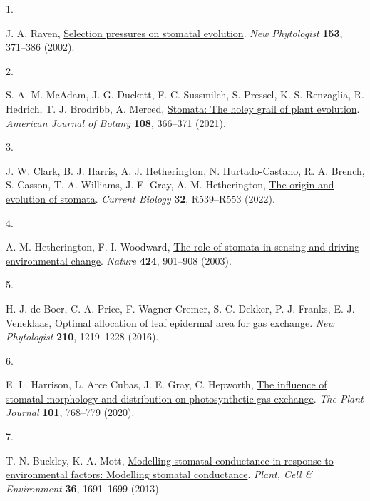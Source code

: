 \documentclass[
  letterpaper,
  DIV=11,
  numbers=noendperiod]{scrartcl}
\newlength{\cslhangindent}
\newlength{\csllabelwidth}
\newenvironment{CSLReferences}[2] %
 {\begin{list}{}{%
  \setlength{\itemindent}{0pt}
  \setlength{\leftmargin}{0pt}
  \setlength{\parsep}{0pt}
  \ifodd #1
   \setlength{\leftmargin}{\cslhangindent}
   \setlength{\itemindent}{-1\cslhangindent}
  \fi
  \setlength{\itemsep}{#2\baselineskip}}}
 {\end{list}}
\newcommand{\CSLLeftMargin}[1]{\parbox[t]{\csllabelwidth}{\strut#1\strut}}
\newcommand{\CSLRightInline}[1]{\parbox[t]{\linewidth - \csllabelwidth}{\strut#1\strut}}
\begin{document}
\label{refs}
\begin{CSLReferences}{0}{1}
\CSLLeftMargin{1. }%
\CSLRightInline{J. A. Raven,
\href{https://doi.org/10.1046/j.0028-646X.2001.00334.x}{Selection
pressures on stomatal evolution}. \emph{New Phytologist} \textbf{153},
371--386 (2002).}

\CSLLeftMargin{2. }%
\CSLRightInline{S. A. M. McAdam, J. G. Duckett, F. C. Sussmilch, S.
Pressel, K. S. Renzaglia, R. Hedrich, T. J. Brodribb, A. Merced,
\href{https://doi.org/10.1002/ajb2.1619}{Stomata: The holey grail of
plant evolution}. \emph{American Journal of Botany} \textbf{108},
366--371 (2021).}

\CSLLeftMargin{3. }%
\CSLRightInline{J. W. Clark, B. J. Harris, A. J. Hetherington, N.
Hurtado-Castano, R. A. Brench, S. Casson, T. A. Williams, J. E. Gray, A.
M. Hetherington, \href{https://doi.org/10.1016/j.cub.2022.04.040}{The
origin and evolution of stomata}. \emph{Current Biology} \textbf{32},
R539--R553 (2022).}

\CSLLeftMargin{4. }%
\CSLRightInline{A. M. Hetherington, F. I. Woodward,
\href{https://doi.org/10.1038/nature01843}{The role of stomata in
sensing and driving environmental change}. \emph{Nature} \textbf{424},
901--908 (2003).}

\CSLLeftMargin{5. }%
\CSLRightInline{H. J. de Boer, C. A. Price, F. Wagner‐Cremer, S. C.
Dekker, P. J. Franks, E. J. Veneklaas,
\href{https://doi.org/10.1111/nph.13929}{Optimal allocation of leaf
epidermal area for gas exchange}. \emph{New Phytologist} \textbf{210},
1219--1228 (2016).}

\CSLLeftMargin{6. }%
\CSLRightInline{E. L. Harrison, L. Arce Cubas, J. E. Gray, C. Hepworth,
\href{https://doi.org/10.1111/tpj.14560}{The influence of stomatal
morphology and distribution on photosynthetic gas exchange}. \emph{The
Plant Journal} \textbf{101}, 768--779 (2020).}

\CSLLeftMargin{7. }%
\CSLRightInline{T. N. Buckley, K. A. Mott,
\href{https://doi.org/10.1111/pce.12140}{Modelling stomatal conductance
in response to environmental factors: {Modelling} stomatal conductance}.
\emph{Plant, Cell \& Environment} \textbf{36}, 1691--1699 (2013).}


\end{CSLReferences}
\end{document}
